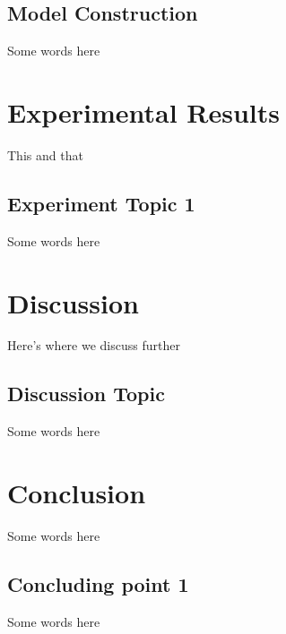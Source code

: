 \documentclass[10pt,twocolumn,letterpaper]{article}
\begin{document}
\subsection{Model Construction}

Some words here

\section{Experimental Results}
\label{sec:results}

This and that

\subsection{Experiment Topic 1}

Some words here

\section{Discussion}
\label{sec:discussion}

Here's where we discuss further

\subsection{Discussion Topic}

Some words here

\section{Conclusion}
\label{sec:conclusion}

Some words here

\subsection{Concluding point 1}

Some words here



\end{document}
